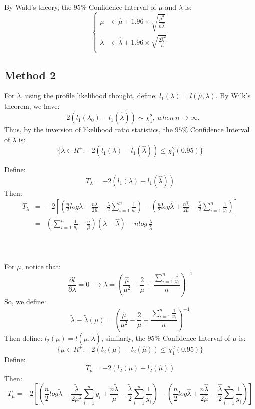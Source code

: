 \documentclass[12pt]{article}
\begin{document}
By Wald's theory, the $95\%$ Confidence Interval of $\mu$ and $\lambda$ is: 
 \begin{equation*}
\left\{                         
\begin{aligned}
\mu &\in \hat{\mu} \pm 1.96 \times \sqrt{\frac{\hat{\mu}^3}{n\hat{\lambda}}}\\
\lambda &\in \hat{\lambda} \pm 1.96 \times \sqrt{\frac{2\hat{\lambda}^2}{n}}\\
\end{aligned}
\right.
\end{equation*}

\subsection{Method 2}
For $\lambda$, using the profile likelihood thought, define: $l_1(\lambda)=l(\hat{\mu},\lambda)$. By Wilk's theorem, we have:
$$-2(l_1(\lambda_0)-l_1(\hat{\lambda}))\sim \chi_{1}^2, \ when \ n \to \infty .$$
Thus, by the inversion of likelihood ratio statistics, the $95\%$ Confidence Interval of $\lambda$ is: 
$$\{  \lambda \in R^{+}:  -2(l_1(\lambda)-l_1(\hat{\lambda}))  \leq    \chi_{1}^2 (0.95) \}$$

Define: 
$$T_{\lambda} = -2(l_1(\lambda)-l_1(\hat{\lambda}))$$
Then:
\begin{eqnarray*}
T_{\lambda} &=& -2[(  \frac{n}{2}log\lambda + \frac{n\lambda}{2\hat{\mu}} -\frac{\lambda}{2} \sum_{i=1}^{n} \frac{1}{y_i}  )-(  \frac{n}{2}log\hat{\lambda} + \frac{n\hat{\lambda}}{2\hat{\mu}} -\frac{\hat{\lambda}}{2} \sum_{i=1}^{n} \frac{1}{y_i}  )] \\
&=& (\sum_{i=1}^{n}\frac{1}{y_i}-\frac{n}{\hat{\mu}})(\lambda-\hat{\lambda})-n log\ \frac{\lambda}{\hat{\lambda}}
\end{eqnarray*}
\\
\\
\\
For $\mu$, notice that:
$$\frac{\partial l}{\partial \lambda}=0 \ \ \to \lambda = (\frac{\hat{\mu}}{\mu^2}-\frac{2}{\mu}+\frac{\sum_{i=1}^{n}\frac{1}{y_i}}{n})^{-1}$$
So, we define:
$$\tilde{\lambda} \equiv \tilde{\lambda}(\mu)=(\frac{\hat{\mu}}{\mu^2}-\frac{2}{\mu}+\frac{\sum_{i=1}^{n}\frac{1}{y_i}}{n})^{-1}$$
Then define: $l_2(\mu)=l(\mu,\tilde{\lambda})$, similarly,  the $95\%$ Confidence Interval of $\mu$ is: 
$$\{  \mu \in R^{+}:  -2(l_2(\mu)-l_2(\hat{\mu}))  \leq    \chi_{1}^2 (0.95) \}$$
Define:
$$T_{\mu} = -2(l_2(\mu)-l_2(\hat{\mu}))$$
Then:
$$T_{\mu}=-2[( \frac{n}{2}log\tilde{\lambda} -\frac{\tilde{\lambda}}{2\mu^2}\sum_{i=1}^{n}y_i + \frac{n\tilde{\lambda}}{\mu} -\frac{\tilde{\lambda}}{2} \sum_{i=1}^{n} \frac{1}{y_i}  )-( \frac{n}{2}log\hat{\lambda} + \frac{n\hat{\lambda}}{2\hat{\mu}} -\frac{\hat{\lambda}}{2} \sum_{i=1}^{n} \frac{1}{y_i} )]$$
\end{document}
